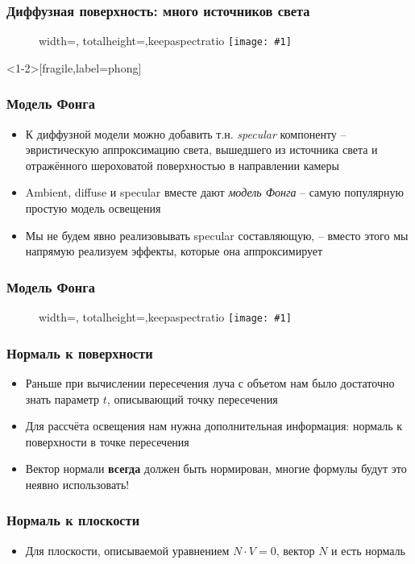 \documentclass[10pt,handout]{beamer}
\newcommand{\slideimage}[1]{
  \begin{figure}
    \begin{adjustbox}{width=\textwidth, totalheight=\textheight-2\baselineskip-2\baselineskip,keepaspectratio}
      \texttt{[image: \#1]}
    \end{adjustbox}
  \end{figure}
}
\begin{document}
\begin{frame}[fragile]
\frametitle{Диффузная поверхность: много источников света}
\slideimage{many_lights.png}
\end{frame}

\begin{frame}<1-2>[fragile,label=phong]
\frametitle{Модель Фонга}
\begin{itemize}
\item К диффузной модели можно добавить т.н. \textit{specular} компоненту -- эвристическую аппроксимацию света, вышедшего из источника света и отражённого шероховатой поверхностью в направлении камеры
\pause
\item Ambient, diffuse и specular вместе дают \textit{модель Фонга} -- самую популярную простую модель освещения
\pause
\item Мы не будем явно реализовывать specular составляющую, -- вместо этого мы напрямую реализуем эффекты, которые она аппроксимирует
\end{itemize}
\end{frame}

\begin{frame}[fragile]
\frametitle{Модель Фонга}
\slideimage{phong.png}
\end{frame}









\begin{frame}[fragile]
\frametitle{Нормаль к поверхности}
\begin{itemize}
\item Раньше при вычислении пересечения луча с объетом нам было достаточно знать параметр \begin{math}t\end{math}, описывающий точку пересечения
\pause
\item Для рассчёта освещения нам нужна дополнительная информация: нормаль к поверхности в точке пересечения
\pause
\item Вектор нормали \textbf{всегда} должен быть нормирован, многие формулы будут это неявно использовать!
\end{itemize}
\end{frame}

\begin{frame}[fragile]
\frametitle{Нормаль к плоскости}
\begin{itemize}
\item Для плоскости, описываемой уравнением \begin{math}N\cdot V=0\end{math}, вектор \begin{math}N\end{math} и есть нормаль
\end{itemize}
\end{frame}
\end{document}
